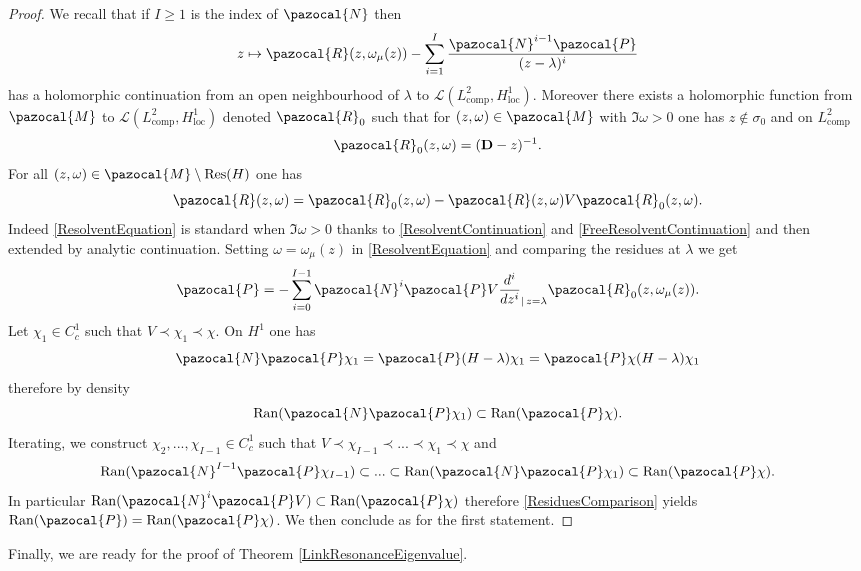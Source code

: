 \documentclass[a4paper, 12pt]{amsart}
\numberwithin{equation}{section}
\newcommand{\loc}{\mathrm{loc}} %
\newcommand{\comp}{\mathrm{comp}} %
\newcommand{\Ran}{\mathrm{Ran}} %
\newcommand{\Res}{\mathrm{Res}} %
\newcommand{\Dvec}{\mathbf{D}}
\newcommand{\Lcal}{\mathcal{L}}
\newcommand{\Mpaz}{\pazocal{M}}
\newcommand{\Npaz}{\pazocal{N}}
\newcommand{\Ppaz}{\pazocal{P}}
\newcommand{\Rpaz}{\pazocal{R}}
\DeclareMathOperator{\tq}{\mathrm{ | }} %
\begin{document}
\begin{proof}
    We recall that if $I\geq 1$ is the index of $\Npaz$ then
    \[z\mapsto \Rpaz(z,\omega_\mu(z))-\sum_{i=1}^I\frac{\Npaz^{i-1}\Ppaz}{(z-\lambda)^i}\]
    has a holomorphic continuation from an open neighbourhood of $\lambda$ to $\Lcal(L^2_\comp,H^1_\loc)$. Moreover there exists a holomorphic function from $\Mpaz$ to $\Lcal(L^2_\comp,H^1_\loc)$ denoted $\Rpaz_0$ such that for $(z,\omega)\in\Mpaz$ with $\Im\omega>0$ one has $z\not\in\sigma_0$ and on $L^2_\comp$
    \begin{equation}\label{FreeResolventContinuation}
        \Rpaz_0(z,\omega)=(\Dvec-z)^{-1}.
    \end{equation}
    For all $(z,\omega)\in\Mpaz\setminus\Res(H)$ one has
    \begin{equation}\label{ResolventEquation}
        \Rpaz(z,\omega)=\Rpaz_0(z,\omega)-\Rpaz(z,\omega)V\Rpaz_0(z,\omega).
    \end{equation}
    Indeed \eqref{ResolventEquation} is standard when $\Im\omega>0$ thanks to \eqref{ResolventContinuation} and \eqref{FreeResolventContinuation} and then extended by analytic continuation. Setting $\omega=\omega_\mu(z)$ in \eqref{ResolventEquation} and comparing the residues at $\lambda$ we get
    \begin{equation}\label{ResiduesComparison}
        \Ppaz=-\sum_{i=0}^{I-1}\Npaz ^i\Ppaz V\dfrac{d^i}{dz^i}_{\tq z=\lambda} \Rpaz_0(z,\omega_\mu(z)).
    \end{equation}
    Let $\chi_1\in C^1_c$ such that $V\prec\chi_1\prec\chi$. On $ H^1$ one has 
    \[\Npaz \Ppaz\chi_1=\Ppaz(H-\lambda)\chi_1=\Ppaz\chi(H-\lambda)\chi_1\]
    therefore by density
    \[\Ran(\Npaz \Ppaz\chi_1)\subset\Ran(\Ppaz\chi).\]
    Iterating, we construct $\chi_2,...,\chi_{I-1}\in C^1_c$ such that $V\prec\chi_{I-1}\prec...\prec\chi_1\prec\chi$ and
    \[\Ran(\Npaz ^{I-1}\Ppaz\chi_{I-1})\subset...\subset\Ran(\Npaz\Ppaz\chi_1)\subset\Ran(\Ppaz\chi).\]
    In particular $\Ran(\Npaz^i\Ppaz V)\subset\Ran(\Ppaz\chi)$ therefore \eqref{ResiduesComparison} yields $\Ran(\Ppaz)=\Ran(\Ppaz\chi)$. We then conclude as for the first statement. 
\end{proof}

Finally, we are ready for the proof of Theorem \ref{LinkResonanceEigenvalue}. 
\end{document}
